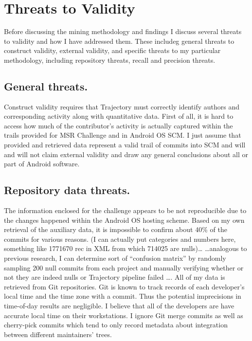 \documentclass[a4paper,10pt]{article}
\numberwithin{equation}{subsection}
\begin{document}
\section{Threats to Validity}
Before discussing the mining methodology and findings I discuss several threats to validity and how 
I have addressed them. These includeg general threats to construct validity, external validity,
and specific threats to my particular methodology, including repository threats, recall and 
precision threats.

\subsection{General threats.}
Construct validity requires that Trajectory must correctly identify authors and corresponding activity
along with quantitative data. First of all, it is hard to access how much of the contributor's activity 
is actually captured within the trails provided for MSR Challenge and in Android OS SCM. I just assume 
that provided and retrieved data represent a valid trail of commits into SCM and will and will not 
claim external validity and draw any general conclusions about all or part of Android software. 

\subsection{Repository data threats.}
The information enclosed for the challenge appears to be not reproducible due to the changes happened 
within the Android OS hosting scheme. Based on my own retrieval of the auxiliary data, it is impossible 
to confirm about 40\% of the commits for various reasons. 
(I can actually put categories and numbers here, something like
1771670 rec in XML from which 714025 are nulls)\ldots 
\ldots analogous to previous research, I can determine sort of ``confusion matrix'' by 
randomly sampling 200 null commits from each project and manually verifying whether or not they 
are indeed nulls or Trajectory pipeline failed \ldots. 
All of my data is retrieved from Git repositories. Git is known to track records of each 
developer’s local time and the time zone with a commit. Thus the potential imprecisions
in time-of-day results are negligible. I believe that all of the developers are have accurate local 
time on their workstations.
I ignore Git merge commits as well as cherry-pick commits which tend to only record metadata about 
integration between different maintainers’ trees.
\end{document}
